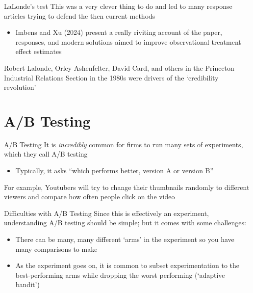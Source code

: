 \documentclass[aspectratio=169,t,11pt,table]{beamer}
\begin{document}
\begin{frame}{LaLonde's test}
	This was a very clever thing to do and led to many response articles trying to defend the then current methods
	\begin{itemize}
		\item Imbens and Xu (2024) present a really riviting account of the paper, responses, and modern solutions aimed to improve observational treatment effect estimates
	\end{itemize}

	\pause
	\bigskip
	Robert Lalonde, Orley Ashenfelter, David Card, and others in the Princeton Industrial Relations Section in the 1980s were drivers of the `credibility revolution'
\end{frame}




\section{A/B Testing}

\begin{frame}{A/B Testing}
  It is \emph{incredibly} common for firms to run many sets of experiments, which they call A/B testing
  \begin{itemize}
    \item Typically, it asks ``which performs better, version A or version B''
  \end{itemize}

	\bigskip
	For example, Youtubers will try to change their thumbnails randomly to different viewers and compare how often people click on the video 
\end{frame}

\begin{frame}{Difficulties with A/B Testing}
	Since this is effectively an experiment, understanding A/B testing should be simple; but it comes with some challenges:
  \begin{itemize}
		\item There can be many, many different `arms' in the experiment so you have many comparisons to make 

		\item As the experiment goes on, it is common to subset experimentation to the best-performing arms while dropping the worst performing (`adaptive bandit')
	\end{itemize}
\end{frame}
\end{document}
